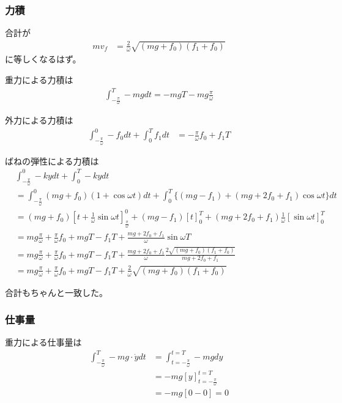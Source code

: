 \documentclass[a4paper,11pt]{jsarticle}
\begin{document}
\subsubsection{力積}
合計が
\begin{align}
  mv_f
   & = \frac{2}{\omega} \sqrt{(mg + f_0)(f_1 + f_0)}
\end{align}
に等しくなるはず。

重力による力積は
\begin{align}
  \int_{-\frac{\pi}{\omega}}^{T} -mgdt = -mgT - mg\frac{\pi}{\omega}
\end{align}

外力による力積は
\begin{align}
  \int_{-\frac{\pi}{\omega}}^{0} -f_0 dt
  + \int_0^T f_1 dt
   & = -\frac{\pi}{\omega}f_0 + f_1 T
\end{align}

ばねの弾性による力積は
\begin{align}
   & \int_{-\frac{\pi}{\omega}}^0 -ky dt
  + \int_0^T -ky dt
  \\
   & = \int_{-\frac{\pi}{\omega}}^0 (mg + f_0)( 1 + \cos \omega t ) dt
  + \int_0^T \Big\{ (mg-f_1) + (mg + 2f_0 + f_1)\cos \omega t\Big\} dt
  \\
   & = (mg + f_0)\left[ t + \frac{1}{\omega} \sin \omega t\right]_{\frac{\pi}{\omega}}^0
  + (mg - f_1)\left[ t \right]_0^T
  + (mg + 2f_0 + f_1) \frac{1}{\omega} \left[ \sin \omega t \right]_0^T
  \\
   & = mg\frac{\pi}{\omega} + \frac{\pi}{\omega} f_0
  + mgT - f_1 T
  + \frac{mg + 2f_0 + f_1}{\omega} \sin \omega T
  \\
   & = mg\frac{\pi}{\omega} + \frac{\pi}{\omega} f_0
  + mgT - f_1 T
  + \frac{mg + 2f_0 + f_1}{\omega} \frac{2\sqrt{(mg + f_0)(f_1+f_0)}}{mg + 2f_0 + f_1}
  \\
   & = mg\frac{\pi}{\omega} + \frac{\pi}{\omega} f_0
  + mgT - f_1 T
  + \frac{2}{\omega} \sqrt{(mg + f_0)(f_1+f_0)}
\end{align}

合計もちゃんと一致した。

\subsubsection{仕事量}
重力による仕事量は
\begin{align}
  \int_{-\frac{\pi}{\omega}}^{T} -mg\cdot \dot{y} dt
   & = \int_{t=-\frac{\pi}{\omega}}^{t=T} -mgdy
  \\
   & =-mg\left[ y \right]_{t=-\frac{\pi}{\omega}}^{t=T}
  \\
   & = -mg\left[ 0 - 0 \right] = 0
\end{align}
\end{document}

